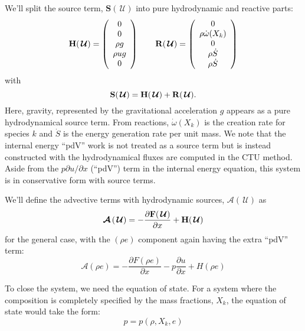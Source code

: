 \documentclass[times,preprint]{aastex63}
\newcommand{\omegadot}{\dot{\omega}}
\newcommand{\ddx}[1]{{\frac{{\partial#1}}{\partial x}}}
\newcommand{\Uc}{{\,\bm{\mathcal{U}}}}
\newcommand{\Fb}{\mathbf{F}}
\newcommand{\Sc}{\mathbf{S}}
\newcommand{\Hb}{{\bf H}}
\newcommand{\Rb}{{\bf R}}
\newcommand{\Advs}[1]{\boldsymbol{\mathcal{A}} \left(#1\right)}
\begin{document}
We'll split the source term, $\Sc(\Uc)$ into pure hydrodynamic and reactive parts:
\begin{equation}
  \label{eq:cons_sources}
  \Hb(\Uc) = \left ( \begin{array}{c}
    0 \\
    0 \\
    \rho g \\
    \rho u g \\
    0 \end{array} \right )
  \qquad
  \Rb(\Uc) = \left ( \begin{array}{c}
     0 \\
     \rho \omegadot(X_k) \\
     0 \\
     \rho \dot{S} \\
     \rho \dot{S} 
  \end{array} \right )
\end{equation}
with 
\begin{equation}
  \Sc(\Uc) = \Hb(\Uc) + \Rb(\Uc).
\end{equation}
Here, gravity, represented by the gravitational acceleration $g$
appears as a pure hydrodynamical source term.  From reactions,
$\omegadot(X_k)$ is the creation rate for species $k$
 and $\dot{S}$ is the energy generation rate per unit
mass.  We note that the internal energy ``pdV'' work is not treated as
a source term but is instead constructed with the hydrodynamical
fluxes are computed in the CTU method.
Aside from the $p\partial u/\partial x$ (``pdV'') term in the internal
energy equation, this system is in conservative form with source
terms.

We'll define the advective terms with hydrodynamic sources, $\Advs{\Uc}$ as
\begin{equation}
\Advs{\Uc} = -\ddx{\Fb(\Uc)} + \Hb(\Uc)
\end{equation}
for the general case, with the $(\rho e)$ component again having the extra
``pdV'' term:
\begin{equation}
\mathcal{A}(\rho e) = -\ddx{F(\rho e)} -p \ddx{u} + H(\rho e)
\end{equation}


To close the system, we need the equation of state.  For a system
where the composition is completely specified by the mass fractions,
$X_k$, the equation of state would take the form:
\begin{equation}
p = p(\rho, X_k, e)
\end{equation}
\end{document}
